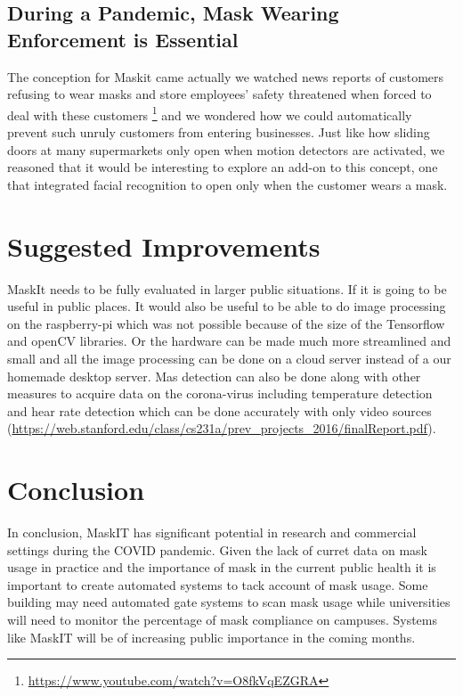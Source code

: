 \documentclass[conference, 12pt, onecolumn]{IEEEtran}
\begin{document}
\subsection{During a Pandemic, Mask Wearing Enforcement is Essential}
The conception for Maskit came actually we watched news reports of customers refusing to wear masks and store employees' safety threatened when forced to deal with these customers \footnote{\url{https://www.youtube.com/watch?v=O8fkVqEZGRA}} and we wondered how we could automatically prevent such unruly customers from entering businesses. Just like how sliding doors at many supermarkets only open when motion detectors are activated, we reasoned that it would be interesting to explore an add-on to this concept, one that integrated facial recognition to open only when the customer wears a mask. 
\section{Suggested Improvements}
MaskIt needs to be fully evaluated in larger public situations. If it is going to be useful in public places. It would also be useful to be able to do image processing on the raspberry-pi which was not possible because of the size of the Tensorflow and openCV libraries.
Or the hardware can be made much more streamlined and small and all the image processing can be done on a cloud server instead of a our homemade desktop server. Mas detection can also be done along with other measures to acquire data on the corona-virus including temperature detection and hear rate detection which can be done accurately with only video sources (\url{https://web.stanford.edu/class/cs231a/prev_projects_2016/finalReport.pdf}).


\section{Conclusion}
In conclusion, MaskIT has significant potential in research and commercial settings during the COVID pandemic. Given the lack of curret data on mask usage in practice and the importance of mask in the current public health it is important to create automated systems to tack account of mask usage. Some building may need automated gate systems to scan mask usage while universities will need to monitor the percentage of mask compliance on campuses. Systems like MaskIT will be of increasing public importance in the coming months. 



\end{document}
